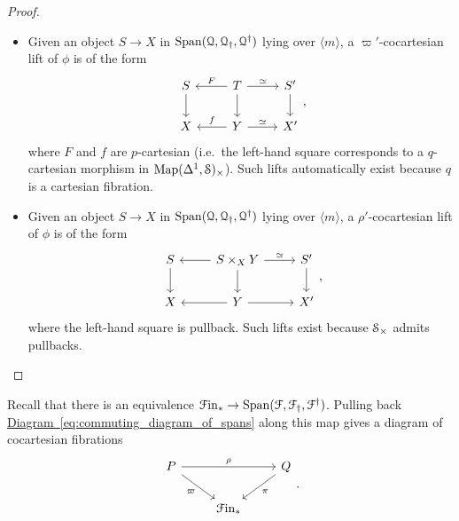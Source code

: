 \documentclass[main.tex]{subfiles}
\begin{document}
\begin{proof}
\begin{itemize}
    \item Given an object $S \to X$ in $\Span\triple{Q}$ lying over $\langle m \rangle$, a $\varpi'$-cocartesian lift of $\phi$ is of the form
      \begin{equation*}
        \begin{tikzcd}
          S
          \arrow[d]
          & T
          \arrow[l, swap, "F"]
          \arrow[r, "\simeq"]
          \arrow[d]
          & S'
          \arrow[d]
          \\
          X
          & Y
          \arrow[l, swap, "f"]
          \arrow[r, "\simeq"]
          & X'
        \end{tikzcd},
      \end{equation*}
      where $F$ and $f$ are $p$-cartesian (i.e.\ the left-hand square corresponds to a $q$-cartesian morphism in $\Map(\Delta^{1}, \S)_{\times}$). Such lifts automatically exist because $q$ is a cartesian fibration.

    \item Given an object $S \to X$ in $\Span\triple{Q}$ lying over $\langle m \rangle$, a $\rho'$-cocartesian lift of $\phi$ is of the form
      \begin{equation*}
        \begin{tikzcd}
          S
          \arrow[d]
          & S \times_{X} Y
          \arrow[l]
          \arrow[r, "\simeq"]
          \arrow[d]
          & S'
          \arrow[d]
          \\
          X
          & Y
          \arrow[l]
          \arrow[r]
          & X'
        \end{tikzcd},
      \end{equation*}
      where the left-hand square is pullback. Such lifts exist because $\S_{\times}$ admits pullbacks.
  \end{itemize}
\end{proof}

Recall that there is an equivalence $\Finp \to \Span\triple{F}$. Pulling back \hyperref[eq:commuting_diagram_of_spans]{Diagram~\ref*{eq:commuting_diagram_of_spans}} along this map gives a diagram of cocartesian fibrations
\begin{equation*}
  \begin{tikzcd}
    P
    \arrow[rr, "\rho"]
    \arrow[dr, swap, "\varpi"]
    && Q
    \arrow[dl, "\pi"]
    \\
    & \Finp
  \end{tikzcd}.
\end{equation*}
\end{document}
